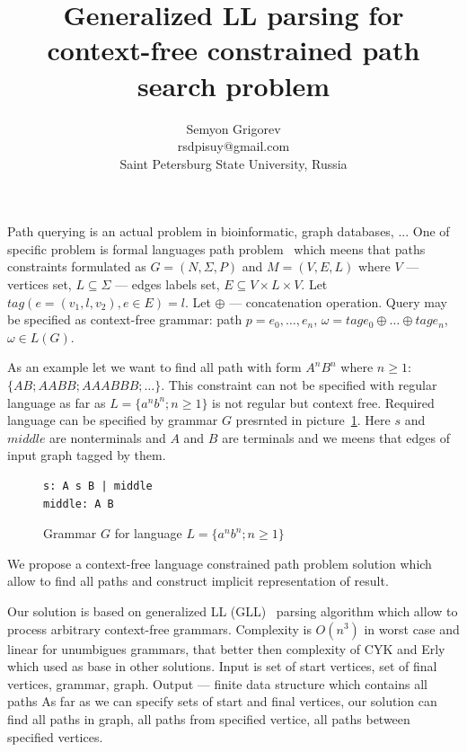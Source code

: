 \documentclass{sig-alternate} %
\begin{document}
\makeatletter
\def\@copyrightspace{\relax}
\makeatother

\title{Generalized LL parsing for context-free constrained path search problem}

\sloppy

\author{Semyon Grigorev\\
rsdpisuy@gmail.com\\
Saint Petersburg State University, Russia}

\maketitle

Path querying is an actual problem in bioinformatic, graph databases, ... One of specific problem is formal languages path problem~\cite{DirOfBigGraphAnalysis} which meens that paths constraints formulated as 
$G=(N, \Sigma, P)$ and $M = (V,E,L)$ where $V$ --- vertices set, $L \subseteq \Sigma$ --- edges labels set, $E\subseteq V\times L\times V$. Let $tag(e = (v_1,l,v_2), e \in E) = l$. Let $\oplus$ --- concatenation operation.
Query may be specified as context-free grammar: path $p = e_0,\dots,e_n$, $\omega = tag e_0 \oplus \dots \oplus tag e_n$, $\omega \in L(G)$. 

As an example let we want to find all path with form $A^n B^n$ where $n \geq 1$: $\{AB; AABB; AAABBB; \dots\}$.
This constraint can not be specified with regular language as far as $L=\{a^n b^n; n \geq 1\}$ is not regular but context free.
Required language can be specified by grammar $G$ presrnted in picture~\ref{grammarG}. Here $s$ and 
$middle$ are nonterminals and $A$ and $B$ are terminals and we meens that edges of input graph 
tagged by them.

\begin{figure}[h]
   \begin{center}
\begin{verbatim}
s: A s B | middle
middle: A B
\end{verbatim}
   \caption{Grammar $G$ for language $L=\{a^n b^n; n \geq 1\}$}
   \label{grammarG}        
   \end{center}
\end{figure}

We propose a context-free language constrained path problem solution which allow to find all paths and construct implicit representation of result. 

Our solution is based on generalized LL (GLL)~\cite{GLL} parsing algorithm which allow to process arbitrary context-free grammars.
Complexity is $O(n^3)$ in worst case and linear for unumbigues grammars, that better then complexity of CYK and Erly which used as base in other solutions.
Input is set of start vertices, set of final vertices, grammar, graph. Output --- finite data structure which contains all paths
As far as we can specify sets of start and final vertices, our solution can find all paths in graph, all paths from specified vertice, all paths between specified vertices.  
\end{document}
